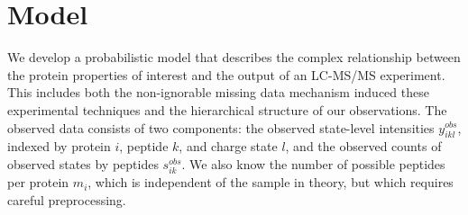 

\section{Model}
\label{proteomics:sec:model}

We develop a probabilistic model that describes the complex relationship between the protein properties of interest and the output of an LC-MS/MS experiment.
This includes both the non-ignorable missing data mechanism induced these experimental techniques and the hierarchical structure of our observations.
The observed data consists of two components: the observed state-level intensities $y_{ikl}^{obs}$, indexed by protein $i$, peptide $k$, and charge state $l$, and the observed counts of observed states by peptides $s_{ik}^{obs}$.
We also know the number of possible peptides per protein $m_i$, which is independent of the sample in theory, but which requires careful preprocessing.

